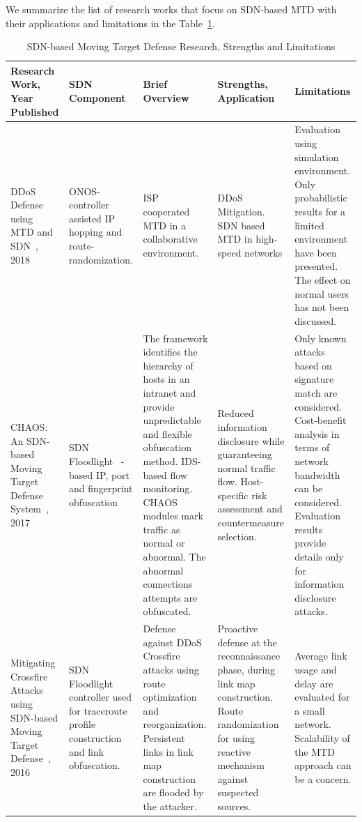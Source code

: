 We summarize the list of research works that focus on SDN-based MTD with their applications and limitations in the Table~\ref{tab:6}.
\begin{table}[!htp]
        \centering
        \caption{SDN-based Moving Target Defense Research, Strengths and Limitations}\label{tab:6}
        \setlength{\extrarowheight}{3pt}
        \begin{tabular}{|p{25mm}|p{25mm}|p{35mm}|p{35mm}|p{35mm}|}
            \hline
            \textbf{Research Work, Year Published} &\textbf{SDN Component}  & \textbf{Brief Overview} & \textbf{Strengths, Application} & \textbf{Limitations} \\
            \hline
            DDoS Defense using MTD and SDN~, 2018 & ONOS-controller assisted IP hopping and route-randomization. & ISP cooperated MTD in a collaborative environment. & DDoS Mitigation. SDN based MTD in high-speed networks &  Evaluation using simulation environment. Only probabilistic results for a limited environment have been presented. The effect on normal users has not been discussed. \\
            \hline
            CHAOS: An SDN-based Moving Target Defense System~, 2017 & SDN Floodlight~ -based IP, port and fingerprint obfuscation & The framework identifies the hierarchy of hosts in an intranet and provide unpredictable and flexible obfuscation method. IDS-based flow monitoring. CHAOS modules mark traffic as normal or abnormal. The abnormal connections attempts are obfuscated. & Reduced information disclosure while guaranteeing normal traffic flow. Host-specific risk assessment and countermeasure selection. & Only known attacks based on signature match are considered. Cost-benefit analysis in terms of network bandwidth can be considered. Evaluation results provide details only for information disclosure attacks. \\
            \hline
            Mitigating Crossfire Attacks using SDN-based Moving Target Defense~, 2016 & SDN Floodlight controller used for traceroute profile construction and link obfuscation. & Defense against DDoS Crossfire attacks using route optimization and reorganization.   Persistent links in link map construction are flooded by the attacker. & Proactive defense at the reconnaissance phase, during link map construction. Route randomization for using reactive mechanism against suspected sources. & Average link usage and delay are evaluated for a small network. Scalability of the MTD approach can be a concern. \\
            \hline

\end{tabular}
\end{table}

